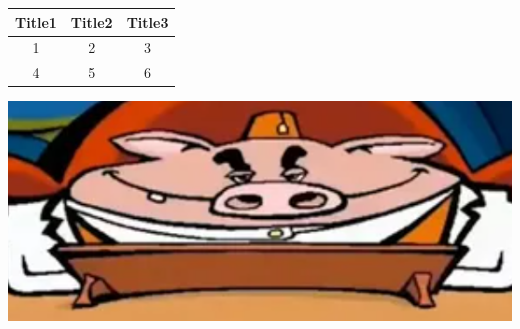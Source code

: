 \documentclass[12pt, letterpaper]{article}
\begin{document}
\begin{tabular}{|c|c|c|}
\hline
Title1& Title2& Title3\\
\hline
1& 2& 3\\
\hline
4& 5& 6\\
\hline
\end{tabular}
\includegraphics{hw_2/artifacts/arifacts_task_2_2/Mr_Svin.png}
\end{document}
